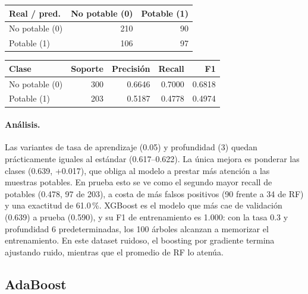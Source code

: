 \documentclass[11pt]{article}
\begin{document}
\begin{table}[H]\footnotesize\begin{minipage}[t]{0.44\linewidth}\centering{}\begin{tabular}{lrr}\toprule
Real / pred. & No potable (0) & Potable (1) \\ \midrule
No potable (0) & 210 & 90 \\
Potable (1) & 106 & 97 \\
\bottomrule\end{tabular}\end{minipage}\hfill\begin{minipage}[t]{0.52\linewidth}\centering{}\begin{tabular}{lrrrr}\toprule
Clase & Soporte & Precisión & Recall & F1 \\ \midrule
No potable (0) & 300 & 0.6646 & 0.7000 & 0.6818 \\
Potable (1) & 203 & 0.5187 & 0.4778 & 0.4974 \\
\bottomrule\end{tabular}\end{minipage}\end{table}

\paragraph{Análisis.} Las variantes de tasa de aprendizaje (0.05) y profundidad (3) quedan prácticamente
iguales al estándar (0.617--0.622). La única mejora es ponderar las clases (0.639,
+0.017), que obliga al modelo a prestar más atención a las muestras potables. En
prueba esto se ve como el segundo mayor recall de potables (0.478, 97 de 203), a costa
de más falsos positivos (90 frente a 34 de RF) y una exactitud de 61.0\,\%. XGBoost es
el modelo que más cae de validación (0.639) a prueba (0.590), y su F1 de entrenamiento
es 1.000: con la tasa 0.3 y profundidad 6 predeterminadas, los 100 árboles alcanzan a
memorizar el entrenamiento. En este dataset ruidoso, el boosting por gradiente termina
ajustando ruido, mientras que el promedio de RF lo atenúa.

\FloatBarrier

\subsection{AdaBoost}
\end{document}
